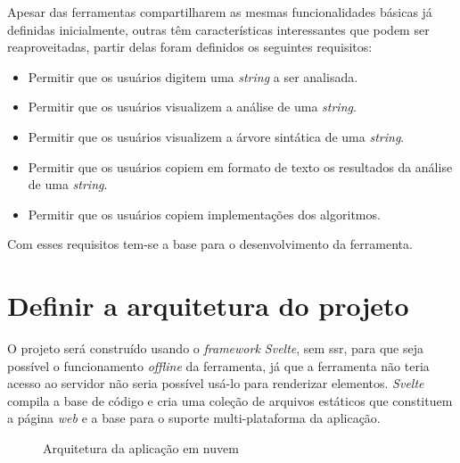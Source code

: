 Apesar das ferramentas compartilharem as mesmas funcionalidades básicas já definidas inicialmente, outras têm características interessantes que podem ser reaproveitadas, partir delas foram definidos os seguintes requisitos:
\begin{itemize}[label={$\sbullet$}]
    \item Permitir que os usuários digitem uma \textit{string} a ser analisada.
    \item Permitir que os usuários visualizem a análise de uma \textit{string}.
    \item Permitir que os usuários visualizem a árvore sintática de uma \textit{string}. 
    \item Permitir que os usuários copiem em formato de texto os resultados da análise de uma \textit{string}.
    \item Permitir que os usuários copiem implementações dos algoritmos. 
\end{itemize}

Com esses requisitos tem-se a base para o desenvolvimento da ferramenta.

\section{Definir a arquitetura do projeto}
O projeto será construído usando o \textit{framework Svelte}, sem \gls{ssr}, para que seja possível o funcionamento \textit{offline} da ferramenta, já que a ferramenta não teria acesso ao servidor não seria possível usá-lo para renderizar elementos. \textit{Svelte} compila a base de código e cria uma coleção de arquivos estáticos que constituem a página \textit{web} e a base para o suporte multi-plataforma da aplicação.
\begin{figure}[ht]
  \centering
  \captionsetup{width=16cm}
  \caption{Arquitetura da aplicação em nuvem}
  \label{fig:arqremo}
\end{figure}

